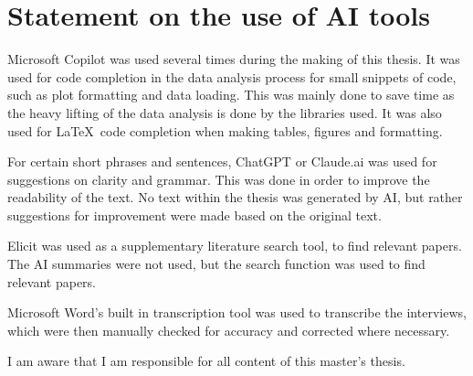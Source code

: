 \chapter{Statement on the use of AI tools}\label{ai-appendix}

Microsoft Copilot was used several times during the making of this thesis. It was used for code completion in the data analysis process for small snippets of code, such as plot formatting and data loading. This was mainly done to save time as the heavy lifting of the data analysis is done by the libraries used. It was also used for \LaTeX\ code completion when making tables, figures and formatting.

For certain short phrases and sentences, ChatGPT or Claude.ai was used for suggestions on clarity and grammar. This was done in order to improve the readability of the text. No text within the thesis was generated by AI, but rather suggestions for improvement were made based on the original text.

Elicit was used as a supplementary literature search tool, to find relevant papers. The AI summaries were not used, but the search function was used to find relevant papers.

Microsoft Word's built in transcription tool was used to transcribe the interviews, which were then manually checked for accuracy and corrected where necessary.

I am aware that I am responsible for all content of this master’s thesis.
